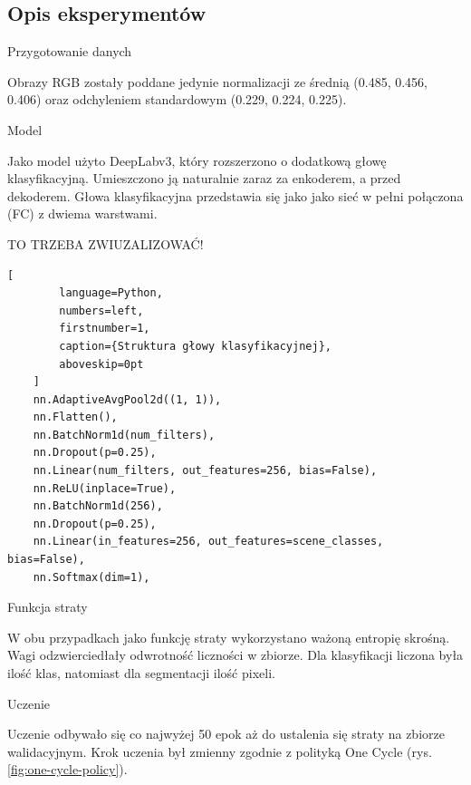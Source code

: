 
\subsection{Opis eksperymentów}
\noindent
Przygotowanie danych

Obrazy RGB zostały poddane jedynie normalizacji ze średnią (0.485, 0.456, 0.406) oraz odchyleniem standardowym (0.229, 0.224, 0.225).

\noindent
Model

Jako  model użyto DeepLabv3, który rozszerzono o dodatkową głowę klasyfikacyjną. Umieszczono ją naturalnie zaraz za enkoderem, a przed dekoderem. Głowa klasyfikacyjna przedstawia się jako jako sieć w pełni połączona (FC) z dwiema warstwami.  

TO TRZEBA ZWIUZALIZOWAĆ!
\begin{addmargin}[6mm]{0mm}
    \begin{lstlisting}[
        language=Python,
        numbers=left,
        firstnumber=1,
        caption={Struktura głowy klasyfikacyjnej},
        aboveskip=0pt
    ]
    nn.AdaptiveAvgPool2d((1, 1)),
    nn.Flatten(),
    nn.BatchNorm1d(num_filters),
    nn.Dropout(p=0.25),
    nn.Linear(num_filters, out_features=256, bias=False),
    nn.ReLU(inplace=True),
    nn.BatchNorm1d(256),
    nn.Dropout(p=0.25),
    nn.Linear(in_features=256, out_features=scene_classes, bias=False),
    nn.Softmax(dim=1),
    \end{lstlisting}
    \end{addmargin}

\noindent
Funkcja straty

W obu przypadkach jako funkcję straty wykorzystano ważoną entropię skrośną. Wagi odzwierciedłały odwrotność liczności w zbiorze. Dla klasyfikacji liczona była ilość klas, natomiast dla segmentacji ilość pixeli.

\noindent
Uczenie

Uczenie odbywało się co najwyżej 50 epok aż do ustalenia się straty na zbiorze walidacyjnym. Krok uczenia był zmienny zgodnie z polityką One Cycle (rys.\ref{fig:one-cycle-policy}).


